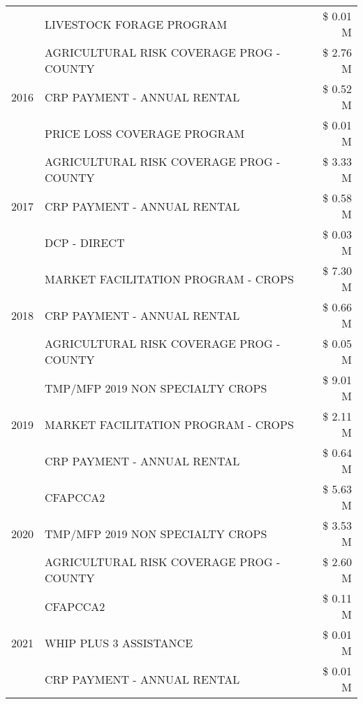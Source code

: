 \begin{tabular}{llr}
 & LIVESTOCK FORAGE PROGRAM & \$ 0.01 M \\
\cline{1-3}
\multirow[t]{3}{*}{2016} & AGRICULTURAL RISK COVERAGE PROG - COUNTY      & \$ 2.76 M \\
 & CRP PAYMENT - ANNUAL RENTAL                   & \$ 0.52 M \\
 & PRICE LOSS COVERAGE PROGRAM                   & \$ 0.01 M \\
\cline{1-3}
\multirow[t]{3}{*}{2017} & AGRICULTURAL RISK COVERAGE PROG - COUNTY & \$ 3.33 M \\
 & CRP PAYMENT - ANNUAL RENTAL & \$ 0.58 M \\
 & DCP - DIRECT & \$ 0.03 M \\
\cline{1-3}
\multirow[t]{3}{*}{2018} & MARKET FACILITATION PROGRAM - CROPS & \$ 7.30 M \\
 & CRP PAYMENT - ANNUAL RENTAL & \$ 0.66 M \\
 & AGRICULTURAL RISK COVERAGE PROG - COUNTY & \$ 0.05 M \\
\cline{1-3}
\multirow[t]{3}{*}{2019} & TMP/MFP 2019 NON SPECIALTY CROPS & \$ 9.01 M \\
 & MARKET FACILITATION PROGRAM - CROPS & \$ 2.11 M \\
 & CRP PAYMENT - ANNUAL RENTAL & \$ 0.64 M \\
\cline{1-3}
\multirow[t]{3}{*}{2020} & CFAPCCA2 & \$ 5.63 M \\
 & TMP/MFP 2019 NON SPECIALTY CROPS & \$ 3.53 M \\
 & AGRICULTURAL RISK COVERAGE PROG - COUNTY & \$ 2.60 M \\
\cline{1-3}
\multirow[t]{3}{*}{2021} & CFAPCCA2 & \$ 0.11 M \\
 & WHIP PLUS 3 ASSISTANCE & \$ 0.01 M \\
 & CRP PAYMENT - ANNUAL RENTAL & \$ 0.01 M \\
\cline{1-3}
\bottomrule
\end{tabular}
